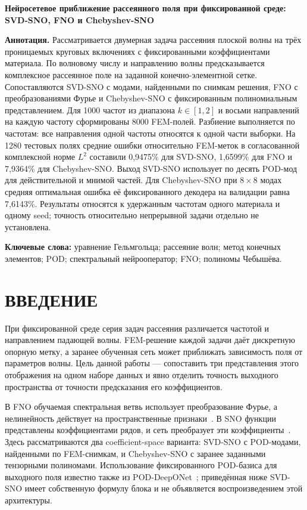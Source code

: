 \documentclass[notitle]{sibjima_preview}
\begin{document}
\thispagestyle{plain}
\pagestyle{plain}
\begin{center}
{\bfseries Нейросетевое приближение рассеянного поля при фиксированной среде: SVD-SNO, FNO и Chebyshev-SNO}
\end{center}

\textbf{Аннотация.}
Рассматривается двумерная задача рассеяния плоской волны на трёх проницаемых круговых включениях с фиксированными коэффициентами материала. По волновому числу и направлению волны предсказывается комплексное рассеянное поле на заданной конечно-элементной сетке. Сопоставляются SVD-SNO с модами, найденными по снимкам решения, FNO с преобразованиями Фурье и Chebyshev-SNO с фиксированным полиномиальным представлением. Для 1000 частот из диапазона \(k\in[1,2]\) и восьми направлений на каждую частоту сформированы 8000 FEM-полей. Разбиение выполняется по частотам: все направления одной частоты относятся к одной части выборки. На 1280 тестовых полях средние ошибки относительно FEM-меток в согласованной комплексной норме \(L^2\) составили 0,9475\% для SVD-SNO, 1,6599\% для FNO и 7,9364\% для Chebyshev-SNO. Выход SVD-SNO использует по десять POD-мод для действительной и мнимой частей. Для Chebyshev-SNO при \(8\times8\) модах средняя оптимальная ошибка её фиксированного декодера на валидации равна 7,6143\%. Результаты относятся к удержанным частотам одного материала и одному seed; точность относительно непрерывной задачи отдельно не установлена.

\textbf{Ключевые слова:} уравнение Гельмгольца; рассеяние волн; метод конечных элементов; POD; спектральный нейрооператор; FNO; полиномы Чебышёва.

\section{ВВЕДЕНИЕ}
При фиксированной среде серия задач рассеяния различается частотой и направлением падающей волны. FEM-решение каждой задачи даёт дискретную опорную метку, а заранее обученная сеть может приближать зависимость поля от параметров волны. Цель данной работы --- сопоставить три представления этого отображения на одном наборе данных и явно отделить точность выходного пространства от точности предсказания его коэффициентов.

В FNO обучаемая спектральная ветвь использует преобразование Фурье, а нелинейность действует на пространственные признаки~\cite{li2020}. В SNO функции представлены коэффициентами рядов, и сеть преобразует эти коэффициенты~\cite{fanaskov2022}. Здесь рассматриваются два coefficient-space варианта: SVD-SNO с POD-модами, найденными по FEM-снимкам, и Chebyshev-SNO с заранее заданными тензорными полиномами. Использование фиксированного POD-базиса для выходного поля известно также из POD-DeepONet~\cite{lu2022}; приведённая ниже SVD-SNO имеет собственную формулу блока и не объявляется воспроизведением этой архитектуры.
\end{document}
